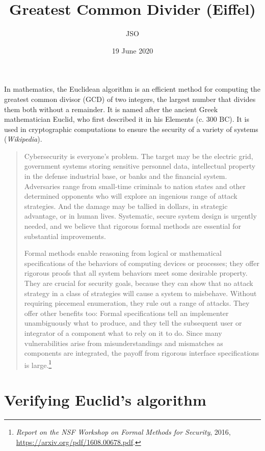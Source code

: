 \documentclass[runningheads,12pt]{article}
\begin{document}
\title{Greatest Common Divider (Eiffel)}
\author{JSO}
\date{19 June 2020}

\maketitle

In mathematics, the Euclidean algorithm is an efficient method for computing the greatest common divisor (GCD) of two integers, the largest number that divides them both without a remainder. It is named after the ancient Greek mathematician Euclid, who first described it in his Elements (c. 300 BC). It is used in cryptographic computations to ensure the security of a variety of systems (\textit{Wikipedia}). 

\begin{quote}
Cybersecurity is everyone’s problem. The target may be the electric grid, government systems storing sensitive personnel data, intellectual property in the defense industrial base, or banks and the financial system. Adversaries range from small-time criminals to nation states and other determined opponents who will explore an ingenious range of attack strategies. And the damage may be tallied in dollars, in strategic advantage, or in human lives. Systematic, secure system design is urgently needed, and we believe that rigorous formal methods are essential for substantial improvements.

Formal methods enable reasoning from logical or mathematical specifications of the behaviors of computing devices or processes; they offer rigorous proofs that all system behaviors meet some desirable property. They are crucial for security goals, because they can show that no attack strategy in a class of strategies will cause a system to misbehave. Without requiring piecemeal enumeration, they rule out a range of attacks. They offer other benefits too: Formal specifications tell an implementer unambiguously what to produce, and they tell the subsequent user or integrator of a component what to rely on it to do. Since many vulnerabilities arise from misunderstandings and mismatches as components are integrated, the payoff from rigorous interface specifications is large.\footnote{%
\textit{Report on the NSF Workshop on Formal Methods for Security}, 2016, \url{https://arxiv.org/pdf/1608.00678.pdf}.}
\end{quote}

\section{Verifying Euclid's algorithm}
\end{document}
